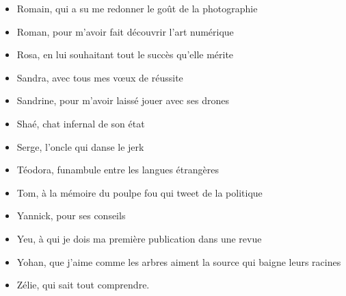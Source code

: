 {\begin{itemize}[label=\ ]
\item Romain, qui a su me redonner le goût de la photographie
\item Roman, pour m'avoir fait découvrir l'art numérique
\item Rosa, en lui souhaitant tout le succès qu'elle mérite
\item Sandra, avec tous mes vœux de réussite
\item Sandrine, pour m'avoir laissé jouer avec ses drones
\item Shaé, chat infernal de son état  
\item Serge, l'oncle qui danse le jerk 
\item Téodora, funambule entre les langues étrangères
\item Tom, à la mémoire du poulpe fou qui tweet de la politique
\item Yannick, pour ses conseils 
\item Yeu, à qui je dois ma première publication dans une revue
\item Yohan, que j'aime comme les arbres aiment la source qui baigne leurs racines
\item Zélie, qui sait tout comprendre. 
\end{itemize}

\newpage\thispagestyle{empty}\addtocounter{page}{-1}

\newpage\thispagestyle{empty}
~\newpage\thispagestyle{empty}


}




